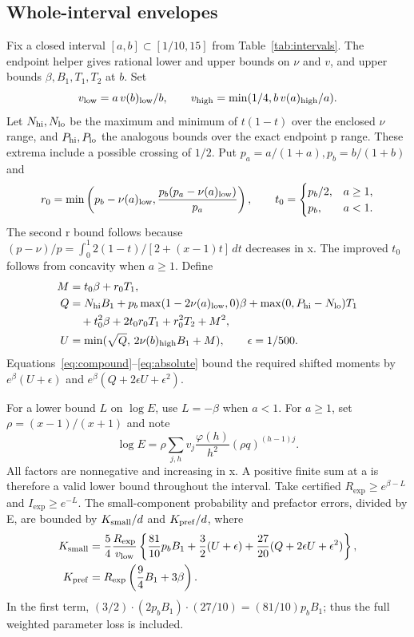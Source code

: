 \documentclass[11pt]{article}
\theoremstyle{remark}\newtheorem{remark}[theorem]{Remark}
\newcommand{\dd}{\,dt}
\begin{document}
\subsection{Whole-interval envelopes}\label{sec:envelopes}
Fix a closed interval $[a,b]\subset[1/10,15]$ from Table~\ref{tab:intervals}.
The endpoint helper gives rational lower and upper bounds on $\nu$ and $v$,
and upper bounds $\beta,B_1,T_1,T_2$ at $b$.
Set
\[
 v_{\rm low}=a\,v(b)_{\rm low}/b,\qquad
 v_{\rm high}=\min(1/4,b\,v(a)_{\rm high}/a).
\]
Let $N_{\rm hi},N_{\rm lo}$ be the maximum and minimum of $t(1-t)$ over the
enclosed $\nu$ range, and $P_{\rm hi},P_{\rm lo}$ the analogous bounds over
the exact endpoint p range. These extrema include a possible crossing of
$1/2$. Put $p_a=a/(1+a),p_b=b/(1+b)$ and
\[
 r_0=\min\left(p_b-\nu(a)_{\rm low},
           \frac{p_b(p_a-\nu(a)_{\rm low})}{p_a}\right),\qquad
 t_0=\begin{cases}p_b/2,&a\ge1,\\p_b,&a<1.\end{cases}
\]
The second r bound follows because
$(p-\nu)/p=\int_0^1 2(1-t)/[2+(x-1)t]\dd$ decreases in x.
The improved $t_0$ follows from concavity when $a\ge1$.
Define
\begin{align}
 M&=t_0\beta+r_0T_1,\\
 Q&=N_{\rm hi}B_1+p_b\max(1-2\nu(a)_{\rm low},0)\beta
          +\max(0,P_{\rm hi}-N_{\rm lo})T_1\notag\\
  &\quad+t_0^2\beta+2t_0r_0T_1+r_0^2T_2+M^2,\\
 U&=\min(\sqrt Q,\,2\nu(b)_{\rm high}B_1+M),\qquad \epsilon=1/500.
\end{align}
Equations~\eqref{eq:compound}--\eqref{eq:absolute} bound the required shifted
moments by $e^\beta(U+\epsilon)$ and
$e^\beta(Q+2\epsilon U+\epsilon^2)$.

For a lower bound $L$ on $\log E$, use $L=-\beta$ when $a<1$.
For $a\ge1$, set $\rho=(x-1)/(x+1)$ and note
\[
 \log E=\rho\sum_{j,h}v_j\frac{\varphi(h)}{h^2}
                                  (\rho q)^{(h-1)j}.
\]
All factors are nonnegative and increasing in x. A positive finite sum at
a is therefore a valid lower bound throughout the interval.
Take certified $R_{\exp}\ge e^{\beta-L}$ and $I_{\exp}\ge e^{-L}$.
The small-component probability and prefactor errors, divided by E, are
bounded by $K_{\rm small}/d$ and $K_{\rm pref}/d$, where
\begin{align}
 K_{\rm small}&=\frac54\frac{R_{\exp}}{v_{\rm low}}
 \left\{\frac{81}{10}p_bB_1+\frac32(U+\epsilon)
       +\frac{27}{20}(Q+2\epsilon U+\epsilon^2)\right\},\\
 K_{\rm pref}&=R_{\exp}\left(\frac94B_1+3\beta\right).
\end{align}
In the first term, $(3/2)\cdot(2p_bB_1)\cdot(27/10)=
(81/10)p_bB_1$; thus the full weighted parameter loss is included.
\end{document}
